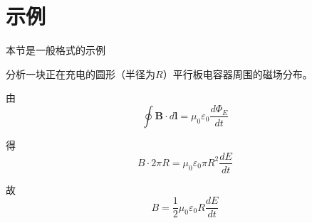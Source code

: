 \documentclass{template}
\begin{document}
\chapter{示例}
\begin{mdframed}
  \centering
    本节是一般格式的示例
\end{mdframed}
\begin{problem}
    分析一块正在充电的圆形（半径为$R$）平行板电容器周围的磁场分布。
\end{problem}
\begin{solution}
    由
    \begin{equation}
        \oint\mathbf{B}\cdot d\mathbf{l}=\mu_0 \varepsilon_0\frac{d\Phi_E}{dt}
    \end{equation}
    
    得
    \begin{equation}
        B\cdot2\pi R=\mu_0\varepsilon_0\pi R^2\frac{dE}{dt}
    \end{equation}
    
    故
    \begin{equation}
        B=\frac{1}{2}\mu_0\varepsilon_0R\frac{dE}{dt}
    \end{equation}
\end{solution}
\end{document}
